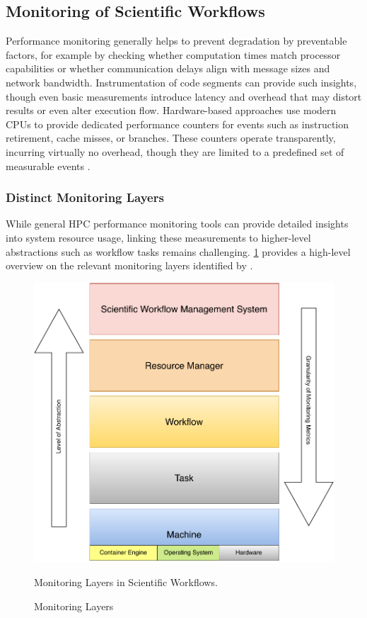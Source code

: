 \subsection{Monitoring of Scientific Workflows}
\label{sec:background_monitoring}
Performance monitoring generally helps to prevent degradation by preventable factors, for example by checking whether computation times match processor capabilities or whether communication delays align with message sizes and network bandwidth. Instrumentation of code segments can provide such insights, though even basic measurements introduce latency and overhead that may distort results or even alter execution flow. Hardware-based approaches use modern CPUs to provide dedicated performance counters for events such as instruction retirement, cache misses, or branches. These counters operate transparently, incurring virtually no overhead, though they are limited to a predefined set of measurable events \cite{STERLING201843} \cite{Witzke2024}.

\subsubsection{Distinct Monitoring Layers}
\label{sec:background_monitoring_layers}
While general HPC performance monitoring tools can provide detailed insights into system resource usage, linking these measurements to higher-level abstractions such as workflow tasks remains challenging. \ref{fig:02-monitoring-layers} provides a high-level overview on the relevant monitoring layers identified by \cite{Bader_2022}.

\begin{figure}[H]
    \centering
    \includegraphics[scale=0.5]{fig/02/02-monitoring-layers.pdf}
    \small
    \caption{Monitoring Layers}
    \label{fig:02-monitoring-layers}
    \tiny
    Monitoring Layers in Scientific Workflows.
\end{figure}

